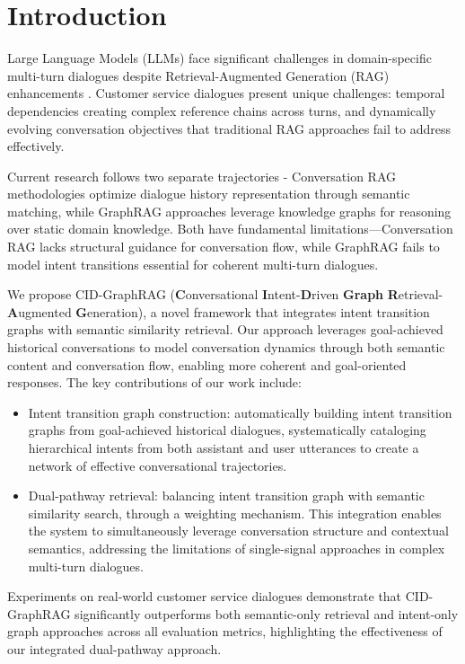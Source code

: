 \documentclass[
]{style/ceurart}
\begin{document}
\section{Introduction}
Large Language Models (LLMs) face significant challenges in domain-specific multi-turn dialogues despite Retrieval-Augmented Generation (RAG) enhancements \cite{Lewis2020}. Customer service dialogues present unique challenges: temporal dependencies creating complex reference chains across turns, and dynamically evolving conversation objectives that traditional RAG approaches fail to address effectively.

Current research follows two separate trajectories - Conversation RAG methodologies \cite{roy2024learning,ye2024boosting} optimize dialogue history representation through semantic matching, while GraphRAG approaches \cite{graphrag2025,graphrag2024,zhang2025credible} leverage knowledge graphs for reasoning over static domain knowledge. Both have fundamental limitations—Conversation RAG lacks structural guidance for conversation flow, while GraphRAG fails to model intent transitions essential for coherent multi-turn dialogues.

We propose CID-GraphRAG (\textbf{C}onversational \textbf{I}ntent-\textbf{D}riven \textbf{Graph} \textbf{R}etrieval-\textbf{A}ugmented \textbf{G}eneration), a novel framework that integrates intent transition graphs with semantic similarity retrieval. 
Our approach leverages goal-achieved historical conversations to model conversation dynamics through both semantic content and conversation flow, enabling more coherent and goal-oriented responses. The key contributions of our work include:
\begin{itemize}
\item Intent transition graph construction: automatically building intent transition graphs from goal-achieved historical dialogues, systematically cataloging hierarchical intents from both assistant and user utterances to create a network of effective conversational trajectories.
\item Dual-pathway retrieval: balancing intent transition graph with semantic similarity search, through a weighting mechanism. This integration enables the system to simultaneously leverage conversation structure and contextual semantics, addressing the limitations of single-signal approaches in complex multi-turn dialogues.
\end{itemize}
Experiments on real-world customer service dialogues demonstrate that CID-GraphRAG significantly outperforms both semantic-only retrieval and intent-only graph approaches across all evaluation metrics, highlighting the effectiveness of our integrated dual-pathway approach.
\end{document}
